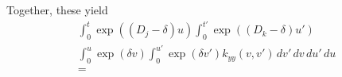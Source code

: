\documentclass[a4paper]{article}
\newcommand{\erf}{\operatorname{erf}}
\begin{document}
Together, these yield
\begin{multline}
  \int_0^t \exp((D_j - \delta) u)
  \int_0^{t'} \exp((D_k - \delta) u') \\
  \int_0^u \exp(\delta v) \int_0^{u'} \exp(\delta v') k_{yy}(v,
  v') \, dv'\, dv\, du'\, du \\
  = 

\end{multline}
\end{document}

